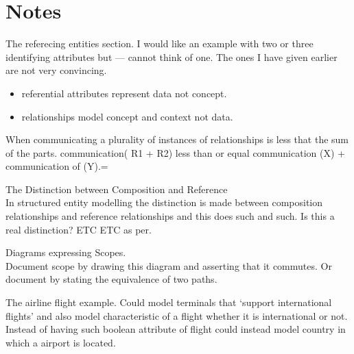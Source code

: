 
\section{Notes}


\begin{noteforfuture}
The referecing entities section. I would like an example with two or three identifying attributes but --- cannot think of one. The ones I have given earlier are not very convincing.
\end{noteforfuture}


\begin{noteforfuture}
\begin{itemize}
\item referential attributes represent data not concept.
\item relationships model concept and context not data. 
\end{itemize}
\end{noteforfuture}

\begin{noteforfuture}
When communicating a plurality of instances of relationships is less that the sum of the parts.
communication( R1 + R2) less than or equal communication (X) + communication of (Y).=
\end{noteforfuture}

\begin{noteforfuture}
 The Distinction between Composition and Reference \\
In structured entity modelling the distinction is made between composition relationships and reference relationships and this does such and such. Is this a real distinction? ETC ETC as per.

Diagrams expressing Scopes.\\
Document scope by drawing this diagram and asserting that it commutes. Or document by stating the equivalence of two paths. 
\end{noteforfuture}

\begin{noteforfuture}
 The airline flight example. Could model terminals that `support international flights' and also
 model characteristic of a flight whether it is international or not. Instead of having such boolean attribute of flight could instead model country in which a airport is located. 
\end{noteforfuture}


